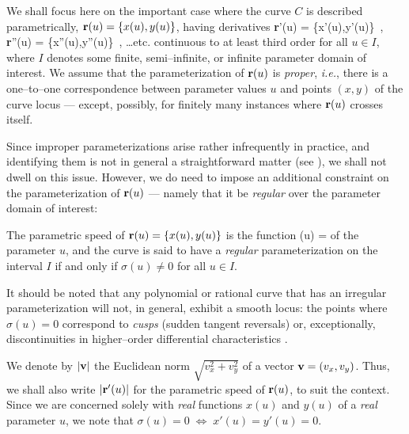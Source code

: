 We shall focus here on the important case where the curve $C$
is described parametrically, ${\bf r}(u)=\{x(u),y(u)\}$, having
derivatives
\be \label{derivs}
{\bf r}'(u) = \{x'(u),y'(u)\} \,, \quad
{\bf r}''(u) = \{x''(u),y''(u)\} \,, \quad
\ldots {\rm etc.}
\ee
continuous to at least third order for all $u \in I$, where $I$
denotes some finite, semi--infinite, or infinite parameter domain
of interest. We assume that the parameterization of ${\bf r}(u)$
is {\it proper}, {\it i.e.}, there is a one--to--one correspondence
between parameter values $u$ and points $(x,y)$ of the curve
locus --- except, possibly, for finitely many instances where
${\bf r}(u)$ crosses itself.

Since improper parameterizations arise rather infrequently in
practice, and identifying them is not in general a straightforward
matter (see \cite{sederberg84,sederberg86}), we shall not dwell on
this issue. However, we do need to impose an additional constraint
on the parameterization of ${\bf r}(u)$ --- namely that it be {\it
regular\/} over the parameter domain of interest:

\begin{dfn}
The parametric speed of ${\bf r}(u)=\{x(u),y(u)\}$ is the
function
\be \label{sigma}
\sigma(u) = 
\ee
of the parameter $u$, and the curve is said to have a {\it
regular\/} parameterization on the interval $I$ if and only if
$\sigma(u)\not=0$ for all $u \in I$.
\end{dfn}

It should be noted that any polynomial or rational curve that
has an irregular parameterization will not, in general, exhibit
a smooth locus: the points where $\sigma(u)=0$ correspond to
{\it cusps\/} (sudden tangent reversals) or, exceptionally,
discontinuities in higher--order differential characteristics
\cite{farouki91b}.

We denote by $|{\bf v}|$ the Euclidean norm $\sqrt{v_x^2
+v_y^2}$ of a vector ${\bf v}=(v_x,v_y)$. Thus, we shall also
write $|{\bf r}'(u)|$ for the parametric speed of ${\bf r}(u)$,
to suit the context. Since we are concerned solely with {\it
real\/} functions $x(u)$ and $y(u)$ of a {\it real\/} parameter
$u$, we note that $\sigma(u)=0\;\Longleftrightarrow\;x'(u)=
y'(u)=0$.

